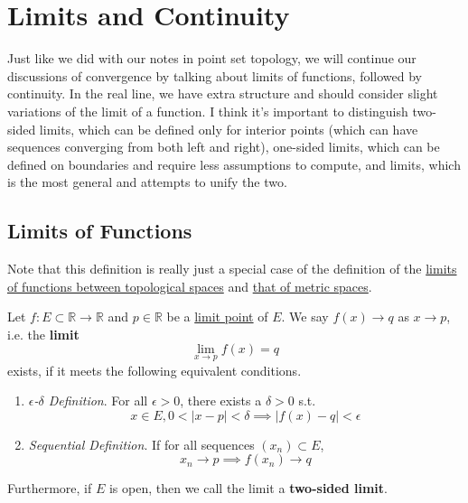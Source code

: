 \section{Limits and Continuity} 

  Just like we did with our notes in point set topology, we will continue our discussions of convergence by talking about limits of functions, followed by continuity. In the real line, we have extra structure and should consider slight variations of the limit of a function. I think it's important to distinguish two-sided limits, which can be defined only for interior points (which can have sequences converging from both left and right), one-sided limits, which can be defined on boundaries and require less assumptions to compute, and limits, which is the most general and attempts to unify the two. 

\subsection{Limits of Functions}

  Note that this definition is really just a special case of the definition of the \hyperref[pst-def:limfunc-top]{limits of functions between topological spaces} and \hyperref[pst-thm:limfunc-met]{that of metric spaces}. 

  \begin{definition}
    \label{def:lim-func}
    Let $f: E \subset \mathbb{R} \to \mathbb{R}$ and $p \in \mathbb{R}$ be a \hyperref[pst-def:limit-point]{limit point} of $E$. We say $f(x) \to q$ as $x \to p$, i.e. the \textbf{limit} 
    \begin{equation}
      \lim_{x \to p} f(x) = q
    \end{equation} 
    exists, if it meets the following equivalent conditions. 
    \begin{enumerate}
      \item \textit{$\epsilon$-$\delta$ Definition}. For all $\epsilon > 0$, there exists a $\delta > 0$ s.t. 
        \begin{equation}
          x \in E, 0 < |x - p| < \delta \implies |f(x) - q| < \epsilon
        \end{equation}

      \item \textit{Sequential Definition}. If for all sequences $(x_n) \subset E$, 
        \begin{equation}
          x_n \to p \implies f(x_n) \to q
        \end{equation}
    \end{enumerate}
    Furthermore, if $E$ is open, then we call the limit a \textbf{two-sided limit}. 
  \end{definition}
 
